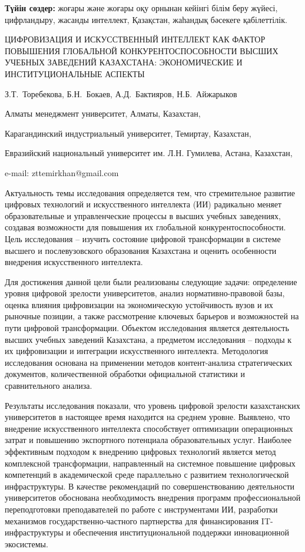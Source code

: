 {\bfseries Түйін сөздер:} жоғары және жоғары оқу орнынан кейінгі білім беру
жүйесі, цифрландыру, жасанды интеллект, Қазақстан, жаһандық бәсекеге
қабілеттілік.

\begin{header}
ЦИФРОВИЗАЦИЯ И ИСКУССТВЕННЫЙ ИНТЕЛЛЕКТ КАК ФАКТОР ПОВЫШЕНИЯ ГЛОБАЛЬНОЙ КОНКУРЕНТОСПОСОБНОСТИ ВЫСШИХ УЧЕБНЫХ ЗАВЕДЕНИЙ КАЗАХСТАНА: ЭКОНОМИЧЕСКИЕ И ИНСТИТУЦИОНАЛЬНЫЕ АСПЕКТЫ

З.Т.~Торебекова\envelope,
Б.Н.~Бокаев,
А.Д.~Бактияров,
Н.Б.~Айжарыков
\end{header}

\begin{affil}
Алматы менеджмент университет, Алматы, Казахстан,

 Карагандинский индустриальный университет, Темиртау, Казахстан,

 Евразийский национальный университет им. Л.Н. Гумилева, Астана, Казахстан,

e-mail: zttemirkhan@gmail.com
\end{affil}

Актуальность темы исследования определяется тем, что стремительное
развитие цифровых технологий и искусственного интеллекта (ИИ) радикально
меняет образовательные и управленческие процессы в высших учебных
заведениях, создавая возможности для повышения их глобальной
конкурентоспособности. Цель исследования -- изучить состояние цифровой
трансформации в системе высшего и послевузовского образования Казахстана
и оценить особенности внедрения искусственного интеллекта.

Для достижения данной цели были реализованы следующие задачи:
определение уровня цифровой зрелости университетов, анализ
нормативно-правовой базы, оценка влияния цифровизации на экономическую
устойчивость вузов и их рыночные позиции, а также рассмотрение ключевых
барьеров и возможностей на пути цифровой трансформации. Объектом
исследования является деятельность высших учебных заведений Казахстана,
а предметом исследования -- подходы к их цифровизации и интеграции
искусственного интеллекта. Методология исследования основана на
применении методов контент-анализа стратегических документов,
количественной обработки официальной статистики и сравнительного
анализа.

Результаты исследования показали, что уровень цифровой зрелости
казахстанских университетов в настоящее время находится на среднем
уровне. Выявлено, что внедрение искусственного интеллекта способствует
оптимизации операционных затрат и повышению экспортного потенциала
образовательных услуг. Наиболее эффективным подходом к внедрению
цифровых технологий является метод комплексной трансформации,
направленный на системное повышение цифровых компетенций в академической
среде параллельно с развитием технологической инфраструктуры. В качестве
рекомендаций по совершенствованию деятельности университетов обоснована
необходимость внедрения программ профессиональной переподготовки
преподавателей по работе с инструментами ИИ, разработки механизмов
государственно-частного партнерства для финансирования IT-инфраструктуры
и обеспечения институциональной поддержки инновационной экосистемы.

